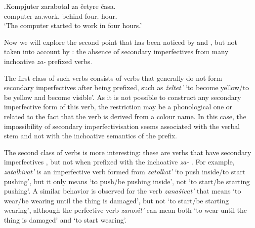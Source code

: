 \exg.\label{ex:zarabotat:rep}Kompjuter zarabotal za \v{c}etyre \v{c}asa.\\
computer za.work. behind four. hour.\\
\trans `The computer started to work in four hours.'

Now we will explore the second point that has been noticed by \citet{Svenonius:04b} and \citet{Braginsky:08}, but not taken into account by \citet{Tatevosov:09}: the absence of secondary imperfectives  from many inchoative  \textit{za-}  prefixed verbs. 

The first class of such verbs consists of verbs that generally do not form secondary imperfectives  after being prefixed, such as \textit{\v{z}eltet'} `to become yellow/to be yellow and become visible'. As it is not possible to construct any secondary imperfective  form of this verb, the restriction may be a phonological one or related to the fact that the verb is derived from a colour name. In this case, the impossibility of secondary imperfectivisation seems associated with the verbal stem and not with the inchoative  semantics of the prefix. 

The second class of verbs is more interesting: these are verbs that have secondary imperfectives , but not when prefixed with the inchoative  \textit{za-}  . For example, \textit{zatalkivat'} is an imperfective verb  formed from \textit{zatolkat'} `to push inside/to start pushing', but it only means `to push/be pushing inside', not `to start/be starting pushing'. A similar behavior is observed for the verb \textit{zana\v{s}ivat'} that means `to wear/be wearing until the thing is damaged', but not `to start/be starting wearing', although the perfective verb  \textit{zanosit'} can mean both `to wear until the thing is damaged' and `to start wearing'.

